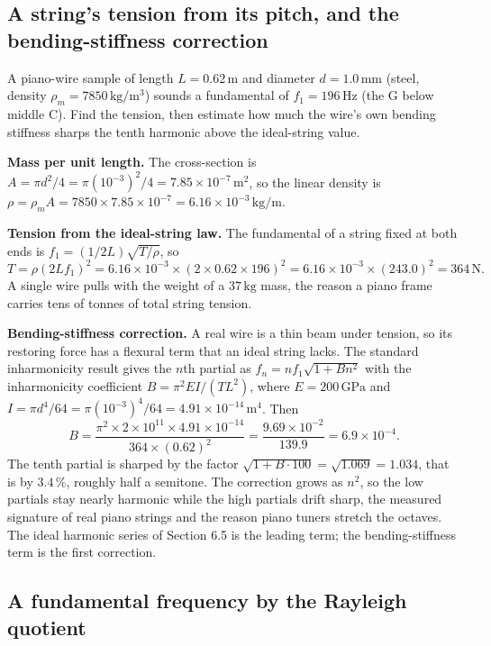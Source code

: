 \subsection{A string's tension from its pitch, and the bending-stiffness
correction}

A piano-wire sample of length $L = 0.62\,\si{\meter}$ and diameter
$d = 1.0\,\si{\milli\meter}$ (steel, density $\rho_m = 7850\,\si{
\kilogram\per\meter\cubed}$) sounds a fundamental of $f_1 = 196\,\si{
\hertz}$ (the G below middle C). Find the tension, then estimate how
much the wire's own bending stiffness sharps the tenth harmonic above
the ideal-string value.

\textbf{Mass per unit length.} The cross-section is $A = \pi d^2/4 =
\pi(10^{-3})^2/4 = 7.85\times 10^{-7}\,\si{\meter\squared}$, so the
linear density is $\rho = \rho_m A = 7850\times 7.85\times 10^{-7} =
6.16\times 10^{-3}\,\si{\kilogram\per\meter}$.

\textbf{Tension from the ideal-string law.} The fundamental of a string
fixed at both ends is $f_1 = (1/2L)\sqrt{T/\rho}$, so
\[
T = \rho(2Lf_1)^2 = 6.16\times 10^{-3}\times (2\times 0.62\times 196)^2
= 6.16\times 10^{-3}\times (243.0)^2 = 364\,\text{N}.
\]
A single wire pulls with the weight of a $37\,\si{\kilogram}$ mass, the
reason a piano frame carries tens of tonnes of total string tension.

\textbf{Bending-stiffness correction.} A real wire is a thin beam under
tension, so its restoring force has a flexural term that an ideal string
lacks. The standard inharmonicity result gives the $n$th partial as
$f_n = n f_1\sqrt{1 + B n^2}$ with the inharmonicity coefficient $B =
\pi^2 E I/(T L^2)$, where $E = 200\,\text{GPa}$ and $I = \pi d^4/64 =
\pi(10^{-3})^4/64 = 4.91\times 10^{-14}\,\si{\meter\tothe{4}}$. Then
\[
B = \frac{\pi^2\times 2\times 10^{11}\times 4.91\times 10^{-14}}{364
\times (0.62)^2} = \frac{9.69\times 10^{-2}}{139.9} = 6.9\times 10^{-4}.
\]
The tenth partial is sharped by the factor $\sqrt{1 + B\cdot 100} =
\sqrt{1.069} = 1.034$, that is by $3.4\,\%$, roughly half a semitone.
The correction grows as $n^2$, so the low partials stay nearly harmonic
while the high partials drift sharp, the measured signature of real
piano strings and the reason piano tuners stretch the octaves. The ideal
harmonic series of Section 6.5 is the leading term; the bending-stiffness
term is the first correction.

\subsection{A fundamental frequency by the Rayleigh quotient}

